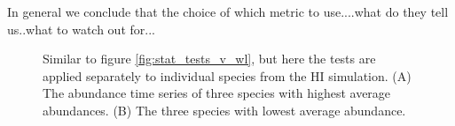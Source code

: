 In general we conclude that the choice of which metric to use....what do they tell us..what to watch out for... 


\begin{figure}[hp]
	\centering
     \caption{Similar to figure \ref{fig:stat_tests_v_wl}, but here the tests are applied separately to individual species from the HI simulation. (A) The abundance time series of three species with highest average abundances. (B) The three species with lowest average abundance.} 
     \label{fig:sp_stat_tests_v_wl}   
\end{figure}

